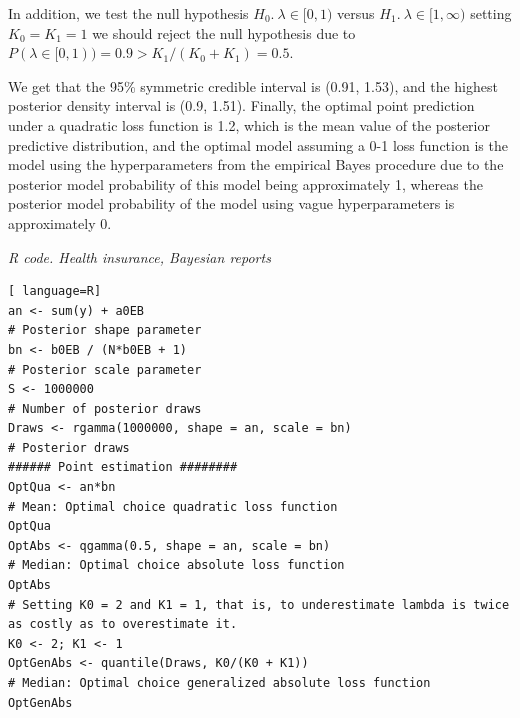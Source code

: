 In addition, we test the null hypothesis $H_0. \ \lambda \in [0,1)$ versus $H_1. \ \lambda \in [1,\infty)$ setting $K_0=K_1=1$ we should reject the null hypothesis due to $P(\lambda \in [0,1))=0.9>K_1/(K_0+K_1)=0.5$.

We get that the 95\% symmetric credible interval is (0.91, 1.53), and the highest posterior density interval is (0.9, 1.51). Finally, the optimal point prediction under a quadratic loss function is 1.2, which is the mean value of the posterior predictive distribution, and the optimal model assuming a 0-1 loss function is the model using the hyperparameters from the empirical Bayes procedure due to the posterior model probability of this model being approximately 1, whereas the posterior model probability of the model using vague hyperparameters is approximately 0.

\begin{tcolorbox}[enhanced,width=4.67in,center upper,
	fontupper=\large\bfseries,drop shadow southwest,sharp corners]
	\textit{R code. Health insurance, Bayesian reports}
\begin{VF}
\begin{lstlisting}[ language=R]
an <- sum(y) + a0EB 
# Posterior shape parameter
bn <- b0EB / (N*b0EB + 1) 
# Posterior scale parameter
S <- 1000000 
# Number of posterior draws
Draws <- rgamma(1000000, shape = an, scale = bn) 
# Posterior draws
###### Point estimation ########
OptQua <- an*bn 
# Mean: Optimal choice quadratic loss function
OptQua
OptAbs <- qgamma(0.5, shape = an, scale = bn) 
# Median: Optimal choice absolute loss function
OptAbs
# Setting K0 = 2 and K1 = 1, that is, to underestimate lambda is twice as costly as to overestimate it.
K0 <- 2; K1 <- 1
OptGenAbs <- quantile(Draws, K0/(K0 + K1)) 
# Median: Optimal choice generalized absolute loss function
OptGenAbs
\end{lstlisting}
\end{VF}
\end{tcolorbox}


